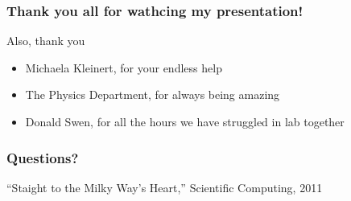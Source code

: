 \documentclass{beamer}
\begin{document}
\begin{frame}
  \frametitle{Thank you all for wathcing my presentation!}
  Also, thank you
  \begin{itemize}
	\item Michaela Kleinert, for your endless help
	\item The Physics Department, for always being amazing
	\item Donald Swen, for all the hours we have struggled in lab together
  \end{itemize}
\end{frame}

{
\begin{frame}
\frametitle{Questions?}
\bigskip
\bigskip
\vspace{6cm}
\bvTFill
\color{white}
\tiny{``Staight to the Milky Way's Heart,'' Scientific Computing, 2011}
\end{frame}
}
\end{document}
